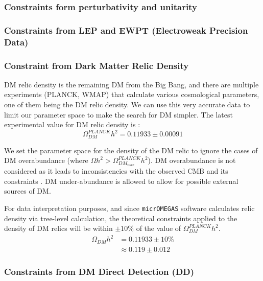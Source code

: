 \documentclass[12pt]{article}
\begin{document}
\subsubsection{Constraints form perturbativity and unitarity}

\subsubsection{Constraints from LEP and EWPT (Electroweak Precision Data)}

\subsubsection{Constraint from Dark Matter Relic Density}
\label{sec:relic density}
DM relic density is the remaining DM from the Big Bang, and there are multiple experiments (PLANCK, WMAP) that calculate various cosmological parameters, one of them being the DM relic density. We can use this very accurate data to limit our parameter space to make the search for DM simpler. The latest experimental value for DM relic density is  \cite{Planck:2018vyg}:
\begin{equation}
    \Omega ^{PLANCK}_{DM} h^2 = 0.11933 \pm 0.00091
\end{equation}

We set the parameter space for the density of the DM relic to ignore the cases of DM overabundance (where $\Omega h^2 > \Omega^{PLANCK}_{DM_{max}}h^2$). DM overabundance is not considered as it leads to inconsistencies with the observed CMB and its constraints \cite{Croon_2024, Zavala_2010}. DM under-abundance is allowed to allow for possible external sources of DM.

For data interpretation purposes, and since \verb|micrOMEGAS| software calculates relic density via tree-level calculation, the theoretical constraints applied to the density of DM relics will be within $\pm10\%$ of the value of $\Omega ^{PLANCK}_{DM} h^2$.
\begin{equation}
    \begin{split}
        \Omega_{DM} h^2 &= 0.11933 \pm 10\% \\
        &\approx 0.119 \pm 0.012
    \end{split}
    \label{eqn:DM relic density value}
\end{equation}

\subsubsection{Constraints from DM Direct Detection (DD)}
\end{document}
